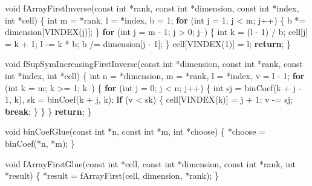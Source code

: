 \documentclass[12pt,]{article}
\newenvironment{Shaded}{\begin{snugshade}}{\end{snugshade}}
\newcommand{\DataTypeTok}[1]{\textcolor[rgb]{0.13,0.29,0.53}{#1}}
\newcommand{\DecValTok}[1]{\textcolor[rgb]{0.00,0.00,0.81}{#1}}
\newcommand{\ControlFlowTok}[1]{\textcolor[rgb]{0.13,0.29,0.53}{\textbf{#1}}}
\newcommand{\NormalTok}[1]{#1}
\begin{document}
\begin{Shaded}
\begin{Highlighting}[]
\DataTypeTok{void}\NormalTok{ fArrayFirstInverse(}\DataTypeTok{const} \DataTypeTok{int}\NormalTok{ *rank, }\DataTypeTok{const} \DataTypeTok{int}\NormalTok{ *dimension, }\DataTypeTok{const} \DataTypeTok{int}\NormalTok{ *index,}
                        \DataTypeTok{int}\NormalTok{ *cell) \{}
    \DataTypeTok{int}\NormalTok{ m = *rank, l = *index, b = }\DecValTok{1}\NormalTok{;}
    \ControlFlowTok{for}\NormalTok{ (}\DataTypeTok{int}\NormalTok{ j = }\DecValTok{1}\NormalTok{; j < m; j++) \{}
\NormalTok{        b *= dimension[VINDEX(j)];}
\NormalTok{    \}}
    \ControlFlowTok{for}\NormalTok{ (}\DataTypeTok{int}\NormalTok{ j = m - }\DecValTok{1}\NormalTok{; j > }\DecValTok{0}\NormalTok{; j--) \{}
        \DataTypeTok{int}\NormalTok{ k = (l - }\DecValTok{1}\NormalTok{) / b;}
\NormalTok{        cell[j] = k + }\DecValTok{1}\NormalTok{;}
\NormalTok{        l -= k * b;}
\NormalTok{        b /= dimension[j - }\DecValTok{1}\NormalTok{];}
\NormalTok{    \}}
\NormalTok{    cell[VINDEX(}\DecValTok{1}\NormalTok{)] = l;}
    \ControlFlowTok{return}\NormalTok{;}
\NormalTok{\}}

\DataTypeTok{void}\NormalTok{ fSupSymIncreasingFirstInverse(}\DataTypeTok{const} \DataTypeTok{int}\NormalTok{ *dimension, }\DataTypeTok{const} \DataTypeTok{int}\NormalTok{ *rank,}
                                   \DataTypeTok{const} \DataTypeTok{int}\NormalTok{ *index, }\DataTypeTok{int}\NormalTok{ *cell) \{}
    \DataTypeTok{int}\NormalTok{ n = *dimension, m = *rank, l = *index, v = l - }\DecValTok{1}\NormalTok{;}
    \ControlFlowTok{for}\NormalTok{ (}\DataTypeTok{int}\NormalTok{ k = m; k >= }\DecValTok{1}\NormalTok{; k--) \{}
        \ControlFlowTok{for}\NormalTok{ (}\DataTypeTok{int}\NormalTok{ j = }\DecValTok{0}\NormalTok{; j < n; j++) \{}
            \DataTypeTok{int}\NormalTok{ sj = binCoef(k + j - }\DecValTok{1}\NormalTok{, k), sk = binCoef(k + j, k);}
            \ControlFlowTok{if}\NormalTok{ (v < sk) \{}
\NormalTok{                cell[VINDEX(k)] = j + }\DecValTok{1}\NormalTok{;}
\NormalTok{                v -= sj;}
                \ControlFlowTok{break}\NormalTok{;}
\NormalTok{            \}}
\NormalTok{        \}}
\NormalTok{    \}}
    \ControlFlowTok{return}\NormalTok{;}
\NormalTok{\}}

\DataTypeTok{void}\NormalTok{ binCoefGlue(}\DataTypeTok{const} \DataTypeTok{int}\NormalTok{ *n, }\DataTypeTok{const} \DataTypeTok{int}\NormalTok{ *m, }\DataTypeTok{int}\NormalTok{ *choose) \{}
\NormalTok{    *choose = binCoef(*n, *m);}
\NormalTok{\}}

\DataTypeTok{void}\NormalTok{ fArrayFirstGlue(}\DataTypeTok{const} \DataTypeTok{int}\NormalTok{ *cell, }\DataTypeTok{const} \DataTypeTok{int}\NormalTok{ *dimension, }\DataTypeTok{const} \DataTypeTok{int}\NormalTok{ *rank,}
                     \DataTypeTok{int}\NormalTok{ *result) \{}
\NormalTok{    *result = fArrayFirst(cell, dimension, *rank);}
\NormalTok{\}}


\end{Highlighting}
\end{Shaded}
\end{document}
